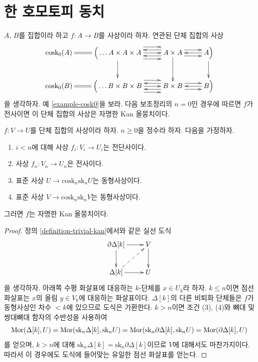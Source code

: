 \section{한 호모토피 동치}
\label{section-homotopy-equivalence}

\noindent
$A$, $B$를 집합이라 하고 $f : A \to B$를 사상이라 하자. 연관된
단체 집합의 사상
$$
\xymatrix{
\text{cosk}_0(A) \ar@{=}[r] &
\Big(\ldots A \times A \times A
\ar[d] \ar@<2ex>[r] \ar@<0ex>[r] \ar@<-2ex>[r] &
A \times A \ar[d] \ar@<1ex>[r] \ar@<-1ex>[r] \ar@<1ex>[l] \ar@<-1ex>[l] &
A \Big) \ar[d] \ar@<0ex>[l] \\
\text{cosk}_0(B) \ar@{=}[r] &
\Big( \ldots B \times B \times B \ar@<2ex>[r] \ar@<0ex>[r] \ar@<-2ex>[r] &
B \times B \ar@<1ex>[r] \ar@<-1ex>[r] \ar@<1ex>[l] \ar@<-1ex>[l] &
B \Big) \ar@<0ex>[l]
}
$$
을 생각하자. 예 \ref{example-cosk0}을 보라. 다음 보조정리의
$n = 0$인 경우에 따르면 $f$가 전사이면 이 단체 집합의 사상은
자명한 Kan 올뭉치이다.

\begin{lemma}
\label{lemma-section}
$f : V \to U$를 단체 집합의 사상이라 하자. $n \geq 0$을 정수라 하자.
다음을 가정하자.
\begin{enumerate}
\item $i < n$에 대해 사상 $f_i : V_i \to U_i$는 전단사이다.
\item 사상 $f_n : V_n \to U_n$은 전사이다.
\item 표준 사상 $U \to \text{cosk}_n \text{sk}_n U$는 동형사상이다.
\item 표준 사상 $V \to \text{cosk}_n \text{sk}_n V$는 동형사상이다.
\end{enumerate}
그러면 $f$는 자명한 Kan 올뭉치이다.
\end{lemma}

\begin{proof}
정의 \ref{definition-trivial-kan}에서와 같은 실선 도식
$$
\xymatrix{
\partial \Delta[k] \ar[r] \ar[d] & V \ar[d] \\
\Delta[k] \ar[r] \ar@{-->}[ru] & U
}
$$
을 생각하자. 아래쪽 수평 화살표에 대응하는 $k$-단체를
$x \in U_k$라 하자. $k \leq n$이면 점선 화살표는 $x$의 올림
$y \in V_k$에 대응하는 화살표이다. $\Delta[k]$의 다른 비퇴화
단체들은 $f$가 동형사상인 차수 $< k$에 있으므로 도식은 가환한다.
$k > n$이면 조건 (3), (4)와 뼈대 및 쌍대뼈대 함자의 수반성을 사용하여
$$
\mathop{\mathrm{Mor}}\nolimits(\Delta[k], U) =
\mathop{\mathrm{Mor}}\nolimits(\text{sk}_n\Delta[k], \text{sk}_nU) =
\mathop{\mathrm{Mor}}\nolimits(\text{sk}_n\partial\Delta[k], \text{sk}_nU) =
\mathop{\mathrm{Mor}}\nolimits(\partial \Delta[k], U)
$$
를 얻으며, $k > n$에 대해
$\text{sk}_n\Delta[k] = \text{sk}_n\partial\Delta[k]$이므로 $V$에
대해서도 마찬가지이다. 따라서 이 경우에도 도식에 들어맞는 유일한
점선 화살표를 얻는다.
\end{proof}

